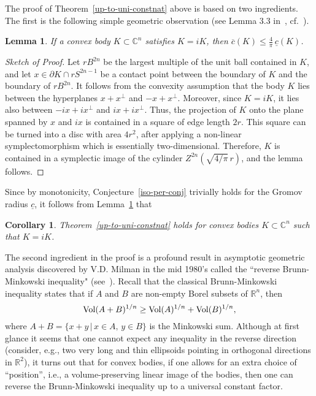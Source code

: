 \documentclass{icmart}
\newtheorem{corollary}[theorem]{Corollary}
\newtheorem{lemma}[theorem]{Lemma}
\theoremstyle{definition}
\begin{document}
The proof of Theorem~\ref{up-to-uni-constnat} above is based on two ingredients. The first is the following simple geometric observation (see Lemma 3.3 in~\cite{AMO}, cf.~\cite{APB}).
\begin{lemma} \label{lem-complex-symetric} 
If a convex body  $K \subset {\mathbb C}^{n}$  satisfies $K=iK$, then  $\overline c(K) \leq {\frac 4 {\pi}} \, \underline c(K)$.
\end{lemma}
\begin{proof}[Sketch of Proof]
Let $rB^{2n}$ be the  largest multiple  of the unit ball contained in $K$, and let $x  \in \partial K \cap rS^{2n-1}$ be a contact point between the boundary of $K$ and the boundary of  $rB^{2n}$.
It follows from the convexity assumption that the body $K$ lies between the hyperplanes $x + x^{\perp}$
and $-x + x^{\perp}$. Moreover,  since $K=iK$, it lies also between $-ix + ix^{\perp}$ and $ix +
ix^{\perp}$. Thus, the projection of $K$ onto the plane spanned
by $x$ and $ix$ is contained in a square of edge length $2r$. This square  can be turned into a disc with area $4r^2$, after applying a non-linear
symplectomorphism which is essentially two-dimensional.  Therefore, $K$
is contained in a symplectic image of the cylinder $Z^{2n}(\sqrt{4/{\pi}}\,r)$, and the lemma follows.
\end{proof}
Since by monotonicity, Conjecture~\ref{iso-per-conj} trivially holds for the Gromov radius $ \underline c$, it follows from Lemma~\ref{lem-complex-symetric}  that
%
%
\begin{corollary} \label{COR:about-sym-bodies}
Theorem~\ref{up-to-uni-constnat} holds for 
convex bodies $K \subset {\mathbb C}^{n}$ such that $K=iK$.  

\end{corollary}
\smallskip


The second ingredient in the proof is  a profound result in asymptotic geometric analysis  discovered by V.D. Milman in the mid 1980's called the ``reverse Brunn-Minkowski inequality" (see~\cite{Mil,Milm1317}).
Recall that the classical Brunn-Minkowski
inequality states that if $A$ and $B$ are non-empty Borel
subsets of ${\mathbb R}^n$, then
$$ {\rm Vol} (A+B)^{1/n} \geq {\rm Vol}(A)^{1/n} + {\rm
Vol}(B)^{1/n},$$ 
where $A+B = \{x+y \, | \, x \in A, \, y \in B \}$ is the Minkowski sum. 
Although at  first glance it seems that one cannot
expect any inequality in the reverse direction (consider, e.g.,  two very long and thin ellipsoids pointing in orthogonal
directions in ${\mathbb R}^2$), it turns out that for convex bodies, if one allows for an extra choice of
``position'', i.e., a volume-preserving linear image of the bodies, then one can reverse the Brunn-Minkowski inequality up to a universal constant factor. %
\end{document}
